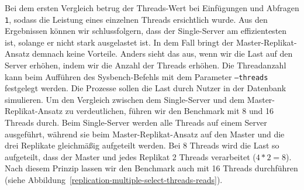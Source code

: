 Bei dem ersten Vergleich betrug der Threads-Wert bei Einfügungen und Abfragen \texttt{1}, sodass die Leistung eines einzelnen Threads ersichtlich wurde.
Aus den Ergebnissen können wir schlussfolgern, dass der Single-Server am effizientesten ist, solange er nicht stark ausgelastet ist.
In dem Fall bringt der Master-Replikat-Ansatz demnach keine Vorteile.
Anders sieht das aus, wenn wir die Last auf den Server erhöhen, indem wir die Anzahl der Threads erhöhen.
Die Threadanzahl kann beim Aufführen des Sysbench-Befehls mit dem Parameter \texttt{--threads} festgelegt werden.
Die Prozesse sollen die Last durch Nutzer in der Datenbank simulieren.
Um den Vergleich zwischen dem Single-Server und dem Master-Replikat-Ansatz zu verdeutlichen, führen wir den Benchmark mit 8 und 16 Threads durch.
Beim Single-Server werden alle Threads auf einem Server ausgeführt, während sie beim Master-Replikat-Ansatz auf den Master und die drei Replikate gleichmäßig aufgeteilt werden.
Bei 8 Threads wird die Last so aufgeteilt, dass der Master und jedes Replikat 2 Threads verarbeitet ($4 * 2 = 8$).
Nach diesem Prinzip lassen wir den Benchmark auch mit 16 Threads durchführen (siehe Abbildung~\ref{replication-multiple-select-threads-reads}).

